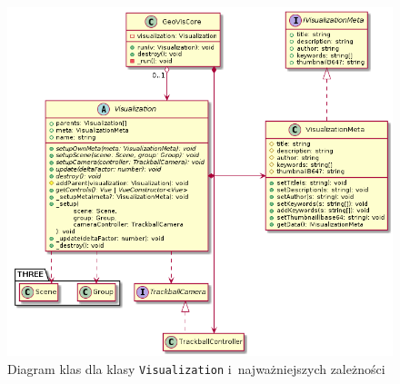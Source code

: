 \begin{figure}
    \centering
    \includegraphics[scale=0.6]{diagrams/out/c3_vis.png}
    \caption{Diagram klas dla klasy \texttt{Visualization} i~najważniejszych zależności}
    \label{fig:c3_vis}
\end{figure}


